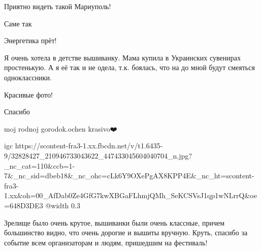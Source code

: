  
 
 
 
 

\qqSecCmt


Приятно видеть такой Мариуполь!

\begin{itemize} %
Саме так
\end{itemize} %


Энергетика прёт!


Я очень хотела в детстве вышиванку. Мама купила в Украинских сувенирах
простенькую. А я её так и не одела, т.к. боялась, что на до мной будут смеяться
одноклассники.


Красивые фото!

\begin{itemize} %
Спасибо
\end{itemize} %


moj rodnoj gorodok.ochen krasivo❤️


\ifcmt
  igc https://scontent-fra3-1.xx.fbcdn.net/v/t1.6435-9/32828427_210946733043622_447433045604040704_n.jpg?_nc_cat=110&ccb=1-7&_nc_sid=dbeb18&_nc_ohc=cLk6Y9OXePgAX8KPP4E&_nc_ht=scontent-fra3-1.xx&oh=00_AfDab0Ze4GfG7kwXBGaFLhmjQMh_SeKCSVsJ1qp1wNLrrQ&oe=648D3DE3
  @width 0.3
\fi


Зрелище было очень крутое, вышиванки были очень классные, причем большинство
видно, что очень дорогие и вышиты вручную. Круть, спасибо за событие всем
организаторам и людям, пришедшим на фестиваль!
